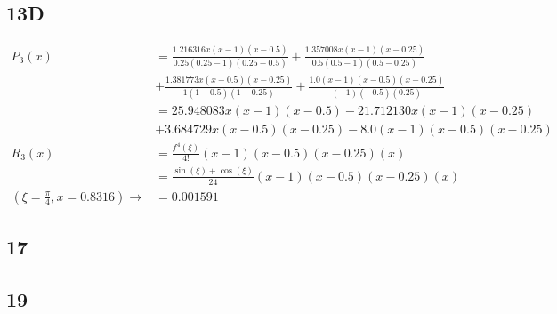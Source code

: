 \documentclass{oisinclass}
\begin{document}
\subsection*{13D}
\begin{align*}
	P_3(x)                                                   & = \frac{1.216316 x \left(x - 1\right) \left(x - 0.5\right)}{0.25 \left(0.25 - 1\right) \left(0.25 - 0.5\right)}
	+ \frac{1.357008 x \left(x - 1\right) \left(x - 0.25\right)}{0.5 \left(0.5 - 1\right) \left(0.5 - 0.25\right)}                                                                                       \\
	                                                         & + \frac{1.381773 x \left(x - 0.5\right) \left(x - 0.25\right)}{1 \left(1 - 0.5\right) \left(1 - 0.25\right)}
	+ \frac{1.0 \left(x - 1\right) \left(x - 0.5\right) \left(x - 0.25\right)}{\left(- 1\right) \left(- 0.5\right) \left(0.25\right)}                                                                    \\
	                                                         & = 25.948083 x \left(x - 1\right) \left(x - 0.5\right)
	- 21.712130 x \left(x - 1\right) \left(x - 0.25\right)                                                                                                                                               \\
	                                                         & + 3.684729 x \left(x - 0.5\right) \left(x - 0.25\right) - 8.0 \left(x - 1\right) \left(x - 0.5\right) \left(x - 0.25\right)               \\
	R_3(x)                                                   & = \frac{f^4(\xi)}{4!}\left(x - 1\right) \left(x - 0.5\right) \left(x - 0.25\right)\left(x\right)                                          \\
	                                                         & = \frac{\sin{\left(\xi \right)} + \cos{\left(\xi \right)}}{24}\left(x - 1\right) \left(x - 0.5\right) \left(x - 0.25\right)\left(x\right) \\
	\left(\xi = \frac{\pi}{4}, x = 0.8316\right) \rightarrow & = 0.001591
\end{align*}
\subsection*{17}
\subsection*{19}
\end{document}
